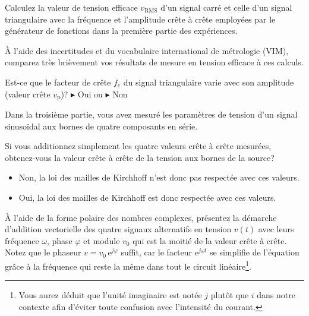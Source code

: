 \documentclass[canadien,12pt,oneside,letterpaper]{article}
\begin{document}
\begin{gradescope}
        \item Calculez la valeur de tension efficace $v_{\mathrm{RMS}}$ d'un signal carré et celle d'un signal triangulaire avec la fréquence et l'amplitude crête à crête employées par le générateur de fonctions dans la première partie des expériences. 
    \begin{gradescope}
        \item À l'aide des incertitudes et du vocabulaire international de métrologie (VIM), comparez très brièvement vos résultats de mesure en tension efficace à ces calculs. %
        \item Est-ce que le facteur de crête $f_{\mathrm{c}}$ du signal triangulaire varie avec son amplitude (valeur crête $v_{\mathrm{p}}$)? $\blacktriangleright$ Oui ou $\blacktriangleright$ Non
    \end{gradescope}
    \item Dans la troisième partie, vous avez mesuré les paramètres de tension d'un signal sinusoïdal aux bornes de quatre composants en série.
    \begin{gradescope}
        \item Si vous additionnez simplement les quatre valeurs crête à crête mesurées, obtenez-vous la valeur crête à crête de la tension aux bornes de la source? 
        \begin{itemize}[label=$\blacktriangleright$]
            \item Non, la loi des mailles de Kirchhoff n'est donc pas respectée avec ces valeurs.
            \item Oui, la loi des mailles de Kirchhoff est donc respectée avec ces valeurs.
        \end{itemize}
        \item À l'aide de la forme polaire des nombres complexes, présentez la démarche d'addition vectorielle des quatre signaux alternatifs en tension $v(t)$ avec leurs fréquence $\omega$, phase $\varphi$ et module $v_0$ qui est la moitié de la valeur crête à crête. Notez que le phaseur $v=v_0\,\mathrm{e}^{j\varphi}$ suffit, car le facteur $\mathrm{e}^{j\omega t}$ se simplifie de l'équation grâce à la fréquence qui reste la même dans tout le circuit linéaire\footnote{Vous aurez déduit que l'unité imaginaire est notée $j$ plutôt que $i$ dans notre contexte afin d'éviter toute confusion avec l'intensité du courant.}.

\end{gradescope}
\end{gradescope}
\end{document}
